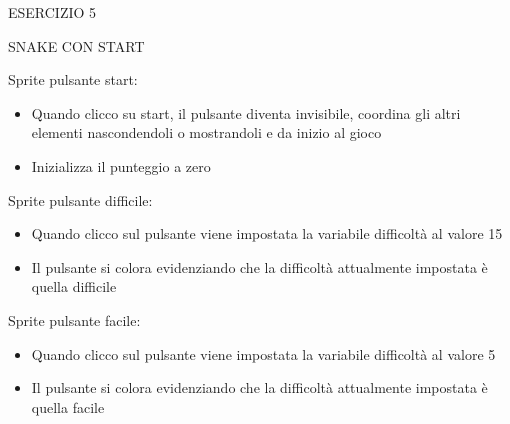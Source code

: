 \documentclass[aspectratio=1610]{beamer}
\begin{document}
\begin{frame}{ESERCIZIO 5}
    \begin{alertblock}{SNAKE CON START}
        \begin{minipage}{0.96\linewidth}
            Sprite pulsante start:
            \begin{itemize}
                \justifying
                \item Quando clicco su start, il pulsante diventa invisibile, coordina gli altri elementi nascondendoli o mostrandoli e da inizio al gioco
                \pause
                \item Inizializza il punteggio a zero
                \pause
            \end{itemize}
            Sprite pulsante difficile:
            \begin{itemize}
                \justifying
                \item Quando clicco sul pulsante viene impostata la variabile difficoltà al valore 15
                \pause
                \item Il pulsante si colora evidenziando che la difficoltà attualmente impostata è quella difficile
                \pause
            \end{itemize}
            Sprite pulsante facile:
            \begin{itemize}
                \justifying
                \item Quando clicco sul pulsante viene impostata la variabile difficoltà al valore 5
                \pause
                \item Il pulsante si colora evidenziando che la difficoltà attualmente impostata è quella facile
            \end{itemize}
        \end{minipage}
    \end{alertblock}
\end{frame}
\end{document}

